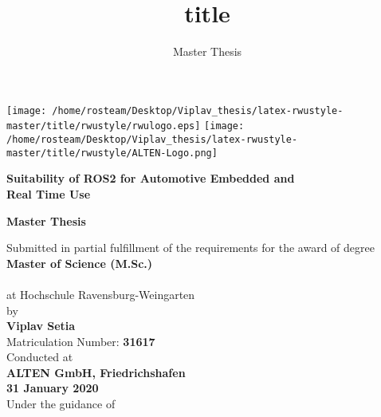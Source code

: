 \documentclass{scrartcl}
\title{title}
\subtitle{Master Thesis}
\begin{document}
\texttt{[image: /home/rosteam/Desktop/Viplav\_thesis/latex-rwustyle-master/title/rwustyle/rwulogo.eps]}
\hspace*{2cm}
\texttt{[image: /home/rosteam/Desktop/Viplav\_thesis/latex-rwustyle-master/title/rwustyle/ALTEN-Logo.png]}
\begin{center}
\vspace*{1.5cm}	{\color{rwuviolet}\huge\normalfont\bfseries Suitability of ROS2 for Automotive Embedded and \\ \vspace*{2mm}Real Time Use}

\vspace*{4mm}	{\color{rwucyan}\Large\normalfont\bfseries Master Thesis}

\vspace*{4mm}	Submitted in partial fulfillment of the requirements for the award of degree\\
\vspace*{3mm} {\large\normalfont\bfseries Master of Science (M.Sc.)}\\
	  \vspace*{3mm}{ in \large\bfseries Mechatronics}	\\
	  \vspace*{3mm} at Hochschule Ravensburg-Weingarten\\
\vspace*{3mm}	by\\
	  \vspace*{2mm} {\large\normalfont\bfseries Viplav Setia}\\
	  \vspace*{2mm} {\large Matriculation Number: \bfseries 31617}\\
	  
	  \vspace*{4mm} {Conducted at}\\
	  \vspace*{3mm} {\large\normalfont\bfseries ALTEN GmbH, Friedrichshafen}\\
	  \vspace*{4mm}	{\large\normalfont\bfseries 31 January 2020}\\
	  \vspace*{5mm}	Under the guidance of\\
	  

\end{center}
\end{document}
